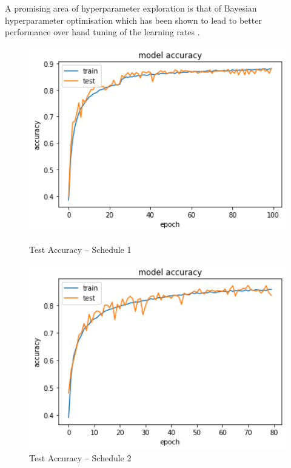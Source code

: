\documentclass[12pt]{article}
\begin{document}
A promising area of hyperparameter exploration is that of Bayesian hyperparameter optimisation which has been shown to lead to better performance over hand tuning of the learning rates \cite{snoek2012practical, bayesian-optim}.

\begin{figure}[htbp]
  \centering
  \begin{minipage}{0.33\textwidth}
    \centering
    \includegraphics[width=1\textwidth]{results/acc-best.png} %
    \caption{Test Accuracy -- Schedule 1}
    \label{sch1}
  \end{minipage}\hfill
  \begin{minipage}{0.33\textwidth}
    \centering
    \includegraphics[width=1\textwidth]{results/acc-4.png} %
    \caption{Test Accuracy -- Schedule 2}

\end{minipage}
\end{figure}
\end{document}
